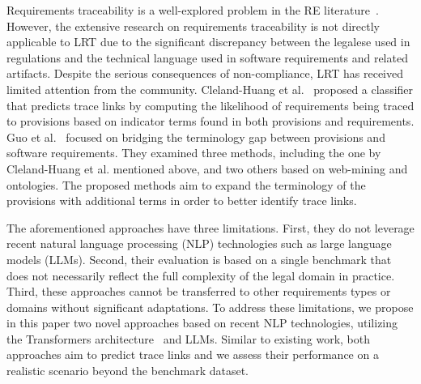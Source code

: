 Requirements traceability is a well-explored problem in the RE literature~\cite{wang2018requirements,tufail2017systematic}.
%
%
%
However, the extensive research on requirements traceability is not directly applicable to LRT due to the significant discrepancy between the legalese used in regulations and the technical language used in software requirements and related artifacts. 
%
Despite the serious consequences of non-compliance, LRT has received limited attention from the community. 
Cleland-Huang et al.~\cite{cleland:2010,Gibiec:2010} proposed a classifier that predicts trace links by computing the likelihood of requirements being traced to provisions based on indicator terms found in both provisions and requirements. 
Guo et al.~\cite{Guo:17} focused on bridging the terminology gap between provisions and software requirements. %
They examined three methods, including the one by Cleland-Huang et al. mentioned above, and two others  based on web-mining and ontologies. The proposed methods aim to expand the terminology of the provisions with additional terms in order to better identify trace links.

The aforementioned approaches have three limitations. First, they do not leverage recent natural language processing (NLP) technologies such as large language models (LLMs).  Second, their evaluation is based on a single benchmark that does not necessarily reflect the full complexity of the legal domain in practice. Third, these approaches cannot be transferred to other requirements types or domains without significant adaptations.
To address these limitations, we propose in this paper two novel approaches based on recent NLP technologies, utilizing the Transformers architecture~\cite{Vaswani:17} and LLMs. Similar to existing work, both approaches aim to predict trace links and we  assess their performance on a realistic scenario beyond the benchmark dataset. 

